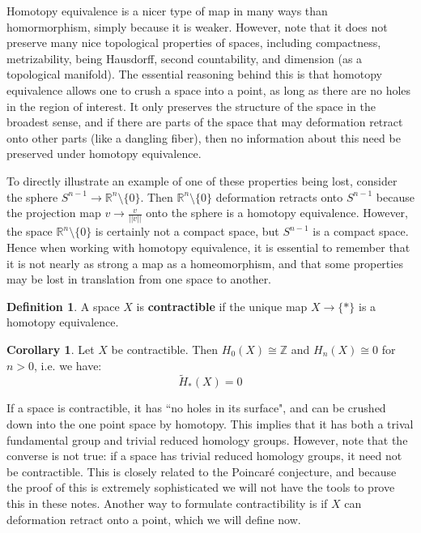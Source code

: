 \documentclass[11pt, oneside]{amsart}   	%
\theoremstyle{definition}
\newtheorem{definition}{Definition}[section]
\newtheorem{corollary}{Corollary}[theorem]
\begin{document}
Homotopy equivalence is a nicer type of map in many ways than homormorphism, simply because it is weaker. However, 
note that it does not preserve many nice topological properties of spaces, including compactness, metrizability, being 
Hausdorff, second countability, and dimension (as a topological manifold).
The essential reasoning behind this is that homotopy equivalence allows one to crush a space into a point, as long as there 
are no holes in the region of interest. It only preserves the structure of the space in the broadest sense, and if there are 
parts of the space that may deformation retract onto other parts (like a dangling fiber), then no information about this 
need be preserved under homotopy equivalence.

To directly illustrate an example of one of these properties being lost, consider the sphere $S^{n - 1}\rightarrow \mathbb R^n
\setminus\{0\}$. Then $\mathbb R^n\setminus\{0\}$ deformation retracts onto $S^{n - 1}$ because the projection map 
$v\rightarrow \frac{v}{||v||}$ onto the sphere is a homotopy equivalence. However, the space $\mathbb R^n\setminus\{0\}$ is 
certainly not a compact space, but $S^{n - 1}$ is a compact space. Hence when working with homotopy equivalence, it is 
essential to remember that it is not nearly as strong a map as a homeomorphism, and that some properties may be lost in 
translation from one space to another.

\begin{definition}
	A space $X$ is \textbf{contractible} if the unique map $X\rightarrow\{*\}$ is a homotopy equivalence. 
\end{definition}

\begin{corollary}
	Let $X$ be contractible. Then $H_0(X) \cong\mathbb Z$ and $H_n(X)\cong 0$ for $n > 0$, i.e. we have:
	\begin{equation}
		\tilde H_*(X) = 0
	\end{equation}
\end{corollary}

If a space is contractible, it has ``no holes in its surface", and can be crushed down into the one point space by homotopy. 
This implies that it has both a trival fundamental group and trivial reduced homology groups. However, note that the converse 
is not true: if a space has trivial reduced homology groups, it need not be contractible. This is closely related to the Poincar\'e 
conjecture, and because the proof of this is extremely sophisticated we will not have the tools to prove this in these notes. 
Another way to formulate contractibility is if $X$ can deformation retract onto a point, which we will define now.
\end{document}
